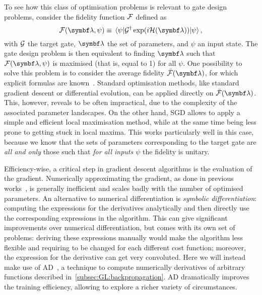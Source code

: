 To see how this class of optimisation problems is relevant to gate design problems, consider the fidelity function ${\mathcal{F}}$ defined as
\begin{equation}
	\calF(\bs\lambda, \psi) \equiv \mel{\psi}{\calG^\dagger \exp(i \calH(\bs\lambda))}{\psi},
	\label{eq:def_fidelity}
\end{equation}
with ${\mathcal{G}}$ the target gate, $\bs\lambda$ the set of parameters, and $\psi$ an input state.
The gate design problem is then equivalent to finding $\bs\lambda$ such that $\calF(\bs\lambda, \psi)$ is maximised (that is, equal to 1) for all $\psi$.
One possibility to solve this problem is to consider the average fidelity $\bar{\calF}(\bs\lambda)$, for which explicit formulas are known~\cite{banchi2011nonperturbative,pedersen2007fidelity,magesan2011gate}.
Standard optimisation methods, like standard gradient descent or differential evolution, can be applied directly on $\bar{\calF}(\bs\lambda)$.
This, however, reveals to be often impractical, due to the complexity of the associated parameter landscapes.
On the other hand, \ac{SGD} allows to apply a simple and efficient local maximisation method, while at the same time being less prone to getting stuck in local maxima.
This works particularly well in this case, because we know that the sets of parameters corresponding to the target gate are \emph{all and only} those such that \emph{for all inputs $\psi$} the fidelity is unitary.

Efficiency-wise, a critical step in gradient descent algorithms is the evaluation of the gradient.
Numerically approximating the gradient, as done in previous works~\cite{banchi2016quantum}, is generally inefficient and scales badly with the number of optimised parameters.
An alternative to numerical differentiation is \emph{symbolic differentiation}: computing the expressions for the derivatives analytically and then directly use the corresponding expressions in the algorithm. This can give significant improvements over numerical differentiation, but comes with its own set of problems: deriving these expressions manually would make the algorithm less flexible and requiring to be changed for each different cost function; moreover, the expression for the derivative can get very convoluted.
Here we will instead make use of \acf{AD}~\cite{bartholomewbiggs2000automatic,bischof2008advances,baydin2018automatic}, a technique to compute numerically derivatives of arbitrary functions described in~\cref{subsec:GL:backpropagation}.
\ac{AD} dramatically improves the training efficiency, allowing to explore a richer variety of circumstances.

